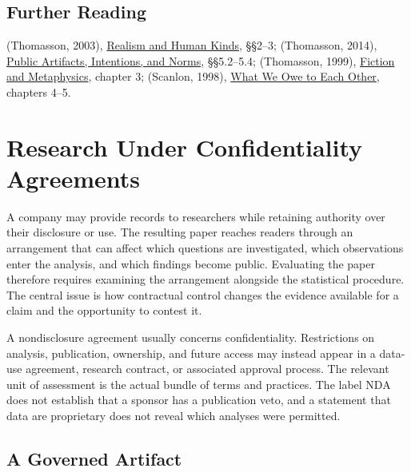 \hypertarget{M09-further-reading}{%
\subsection{Further Reading}\label{M09-further-reading}}

\noindent (Thomasson, 2003),
\href{https://doi.org/10.1111/j.1933-1592.2003.tb00309.x}{Realism and
Human Kinds}, §§2--3; (Thomasson, 2014),
\href{https://www.amiethomasson.org/_files/ugd/63fc8a_840cc91860474dfa99802928543989fb.doc}{Public
Artifacts, Intentions, and Norms}, §§5.2--5.4; (Thomasson, 1999),
\href{https://www.cambridge.org/core/books/abs/fiction-and-metaphysics/fictional-characters-as-abstract-artifacts/CE4968D080D4B81C9DE76FF589C70017}{Fiction
and Metaphysics}, chapter 3; (Scanlon, 1998),
\href{https://www.hup.harvard.edu/books/9780674004238}{What We Owe to
Each Other}, chapters 4--5.


\hypertarget{M09-research-under-confidentiality-agreements}{%
\section{Research Under Confidentiality
Agreements}\label{M09-research-under-confidentiality-agreements}}

\noindent A company may provide records to researchers while retaining authority
over their disclosure or use. The resulting paper reaches readers
through an arrangement that can affect which questions are investigated,
which observations enter the analysis, and which findings become public.
Evaluating the paper therefore requires examining the arrangement
alongside the statistical procedure. The central issue is how
contractual control changes the evidence available for a claim and the
opportunity to contest it.

A nondisclosure agreement usually concerns confidentiality. Restrictions
on analysis, publication, ownership, and future access may instead
appear in a data-use agreement, research contract, or associated
approval process. The relevant unit of assessment is the actual bundle
of terms and practices. The label NDA does not establish that a sponsor
has a publication veto, and a statement that data are proprietary does
not reveal which analyses were permitted.

\hypertarget{M09-a-governed-artifact}{%
\subsection{A Governed Artifact}\label{M09-a-governed-artifact}}

